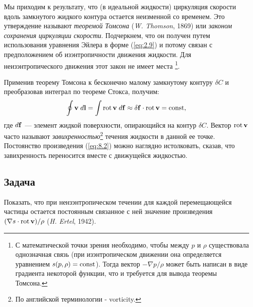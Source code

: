 Мы приходим к результату, что (в идеальной жидкости) циркуляция скорости вдоль
замкнутого жидкого контура остается неизменной со временем. Это утверждение
называют \textit{теоремой Томсона} (\textit{W. Thomson}, 1869) или
\textit{законом сохранения циркуляции скорости}. Подчеркнем, что он получен
путем использования уравнения Эйлера в форме (\ref{eq:2.9}) и потому связан с
предположением об изэнтропичности движения жидкости. Для неизэнтропического
движения этот закон не имеет места \footnote{С математической точки зрения необходимо,
чтобы между $p$ и $\rho$ существовала однозначная связь (при изэнтропическом движении
она определяется уравнением $s(p,\rho) = \mathop{\mathrm{const}}\nolimits$). Тогда вектор $- \nabla p/\rho$ может
быть написан в виде градиента некоторой функции, что и требуется для вывода теоремы Томсона.}.

Применив теорему Томсона к бесконечно малому замкнутому контуру $\delta C$
и преобразовав интеграл по теореме Стокса, получим:
\begin{equation}
   \label{eq:8.2}
   \oint { \mathbf{v} }\; d\mathbf{l} = \int \mathop{\mathrm{rot}}\nolimits { \mathbf{v} }\; d\mathbf{f} \approx \delta \mathbf{f} \cdot
   \mathop{\mathrm{rot}}\nolimits { \mathbf{v} } = \mathop{\mathrm{const}}\nolimits,
\end{equation}
где $d\mathbf{f}$ — элемент жидкой поверхности, опирающийся на контур $\delta C$.
Вектор $\mathop{\mathrm{rot}}\nolimits { \mathbf{v} }$ часто называют \textit{завихренностью}\footnote{По английской терминологии
- vorticity.} течения жидкости в
данной ее точке. Постоянство произведения (\ref{eq:8.2}) можно наглядно истолковать,
сказав, что завихренность переносится вместе с движущейся жидкостью.

\subsection*{Задача}
Показать, что при нензэнтропическом течении для каждой перемещающейся частицы
остается постоянным связанное с ней значение произведения
$(\nabla s \cdot \mathop{\mathrm{rot}}\nolimits { \mathbf{v} })/\rho$ (\textit{H. Ertel}, 1942).

